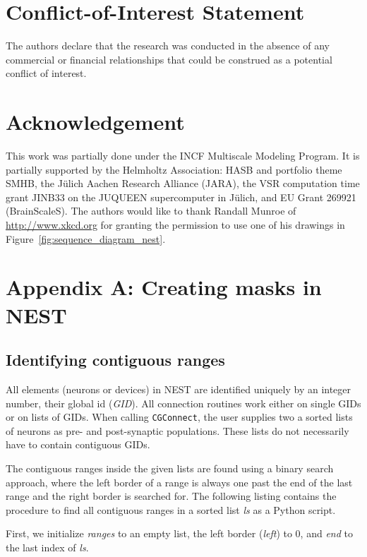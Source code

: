 \documentclass{frontiersSCNS} %
\begin{document}
\section*{Conflict-of-Interest Statement}
The authors declare that the research was conducted in the absence of
any commercial or financial relationships that could be construed as a
potential conflict of interest.

\section*{Acknowledgement}
This work was partially done under the INCF Multiscale Modeling
Program. It is partially supported by the Helmholtz Association: HASB
and portfolio theme SMHB, the Jülich Aachen Research Alliance (JARA),
the VSR computation time grant JINB33 on the JUQUEEN supercomputer in
Jülich, and EU Grant 269921 (BrainScaleS). The authors would like to
thank Randall Munroe of \url{http://www.xkcd.org} for granting the
permission to use one of his drawings in
Figure~\ref{fig:sequence_diagram_nest}.

\section*{Appendix A: Creating masks in NEST}\label{sec:creating_masks}

\subsection*{Identifying contiguous ranges}

All elements (neurons or devices) in NEST are identified uniquely by
an integer number, their global id (\emph{GID}). All connection
routines work either on single GIDs or on lists of GIDs. When calling
\verb|CGConnect|, the user supplies two a sorted lists of neurons as
pre- and post-synaptic populations. These lists do not necessarily
have to contain contiguous GIDs.

The contiguous ranges inside the given lists are found using a binary
search approach, where the left border of a range is always one past
the end of the last range and the right border is searched for. The
following listing contains the procedure to find all contiguous ranges
in a sorted list \emph{ls} as a Python script.

First, we initialize \emph{ranges} to an empty list, the left border
(\emph{left}) to 0, and \emph{end} to the last index of \emph{ls}.
\end{document}
